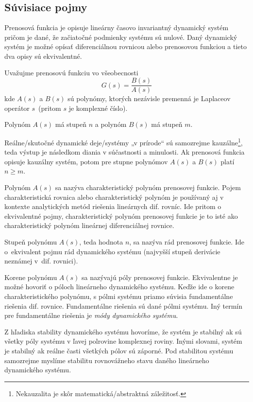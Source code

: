 \documentclass[a4paper, 10pt, ]{article}
\begin{document}
    





\subsection{Súvisiace pojmy}

Prenosová funkcia je opisuje lineárny časovo invariantný dynamický systém pričom je dané, že začiatočné podmienky systému sú nulové. Daný dynamický systém je možné opísať diferenciálnou rovnicou alebo prenosovou funkciou a tieto dva opisy sú ekvivalentné. 

Uvažujme prenosovú funkciu vo všeobecnosti
\begin{equation}
    G(s) = \frac{B(s)}{A(s)}
\end{equation}
kde $A(s)$ a $B(s)$ sú polynómy, ktorých nezávisle premenná je Laplaceov operátor $s$~(pritom $s$ je komplexné číslo). 

Polynóm $A(s)$ má stupeň $n$ a polynóm $B(s)$ má stupeň $m$.

Reálne/skutočné dynamické deje/systémy „v prírode“ sú samozrejme kauzálne\footnote{Nekauzalita je skôr matematická/abstraktná záležitosť.}, teda výstup je následkom diania v súčastnosti a minulosti. Ak prenosová funkcia opisuje kauzálny systém, potom pre stupne polynómov $A(s)$ a $B(s)$ platí $n \geq m$.

Polynóm $A(s)$ sa nazýva charakteristický polynóm prenosovej funkcie. Pojem charakteristická rovnica alebo charakteristický polynóm je používaný aj v kontexte analytických metód riešenia lineárnych dif. rovníc. Ide pritom o ekvivalentné pojmy, charakteristický polynóm prenosovej funkcie je to isté ako charakteristický polynóm lineárnej diferenciálnej rovnice.

Stupeň polynómu $A(s)$, teda hodnota $n$, sa nazýva rád prenosovej funkcie. Ide o~ekvivalent pojmu rád dynamického systému (najvyšší stupeň derivácie neznámej v~dif. rovnici).

Korene polynómu $A(s)$ sa nazývajú póly prenosovej funkcie. Ekvivalentne je možné hovoriť o póloch lineárneho dynamického systému. Keďže ide o korene charakteristického polynómu, s pólmi systému priamo súvisia fundamentálne riešenia dif. rovnice. Fundamentálne riešenia sú dané pólmi systému. Iný termín pre fundamentálne riešenia je \emph{módy dynamického systému}.

Z hľadiska stability dynamického systému hovoríme, že systém je stabilný ak sú všetky póly systému v ľavej polrovine komplexnej roviny. Inými slovami, systém je stabilný ak reálne časti všetkých pólov sú záporné. Pod stabilitou systému samozrejme myslíme stabilitu rovnovážneho stavu daného lineárneho dynamického systému.
\end{document}
